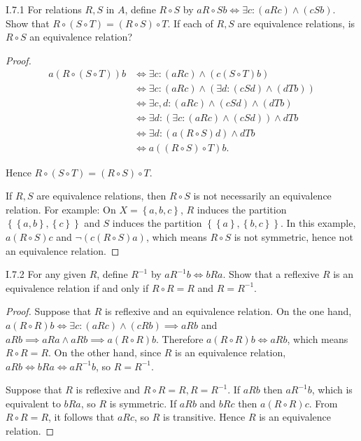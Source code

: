 \begin{problem}{I.7.1}
For relations \( R, S \) in \( A \), define \( R \circ S \) by \( a R \circ S b \iff \exists c: (a R c) \land (c S b) \). Show that \( R \circ (S \circ T) = (R \circ S) \circ T \). If each of \( R, S \) are equivalence relations, is \( R \circ S \) an equivalence relation?
\end{problem}

\begin{proof}
	\begingroup
	\allowdisplaybreaks%
	\begin{align*}
		a (R \circ (S \circ T)) b & \iff \exists c: (aRc) \land (c (S\circ T) b)               \\
		                          & \iff \exists c: (aRc) \land (\exists d: (cSd) \land (dTb)) \\
		                          & \iff \exists c, d: (aRc) \land (cSd) \land (dTb)           \\
		                          & \iff \exists d: (\exists c: (aRc) \land (cSd)) \land dTb   \\
		                          & \iff \exists d: (a (R\circ S) d) \land dTb                 \\
		                          & \iff a ((R\circ S) \circ T) b.
	\end{align*}
	\endgroup

	Hence \( R \circ (S \circ T) = (R \circ S) \circ T \).

	If \( R, S \) are equivalence relations, then \( R\circ S \) is not necessarily an equivalence relation. For example: On \( X = \left\{ a, b, c \right\} \), \( R \) induces the partition \( \left\{ \left\{ a, b \right\}, \left\{ c \right\} \right\} \) and \( S \) induces the partition \( \left\{ \left\{ a \right\}, \left\{ b, c \right\} \right\} \). In this example, \( a(R\circ S)c \) and \( \neg (c (R\circ S) a) \), which means \( R \circ S \) is not symmetric, hence not an equivalence relation.
\end{proof}

\begin{problem}{I.7.2}
For any given \( R \), define \( R^{-1} \) by \( a R^{-1} b \iff b R a \). Show that a reflexive \( R \) is an equivalence relation if and only if \( R \circ R = R \) and \( R = R^{-1} \).
\end{problem}

\begin{proof}
	Suppose that \( R \) is reflexive and an equivalence relation. On the one hand, \( a(R\circ R)b \iff \exists c: (aRc) \land (cRb) \implies aRb \) and \( aRb \implies aRa \land aRb \implies a(R\circ R)b \). Therefore \( a(R\circ R)b \iff aRb \), which means \( R\circ R = R \). On the other hand, since \( R \) is an equivalence relation, \( aRb \iff bRa \iff aR^{-1}b \), so \( R = R^{-1} \).

	Suppose that \( R \) is reflexive and \( R \circ R = R, R = R^{-1} \). If \( aRb \) then \( aR^{-1}b \), which is equivalent to \( bRa \), so \( R \) is symmetric. If \( aRb \) and \( bRc \) then \( a(R\circ R)c \). From \( R \circ R = R \), it follows that \( a R c \), so \( R \) is transitive. Hence \( R \) is an equivalence relation.
\end{proof}

